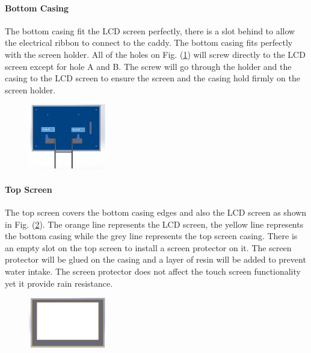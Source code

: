 \documentclass[11pt,landscape]{article}
\begin{document}
\begin{multicols}{3}
\paragraph{Bottom Casing}
The bottom casing fit the LCD screen perfectly, there is a slot behind to allow
the electrical ribbon to connect to the caddy. The bottom casing fits perfectly
with the screen holder. All of the holes on Fig. (\ref{fig:bottom_casing}) will screw
directly to the LCD screen except for hole A and B. The screw will go through
the holder and the casing to the LCD screen to ensure the screen and the casing
hold firmly on the screen holder.

\begin{figure}[H]
    \begin{center}
        \includegraphics[width=0.3\textwidth]{bottomcasing.png}
        \label{fig:bottom_casing}
    \end{center}
\end{figure}

\paragraph{Top Screen}
The top screen covers the bottom casing edges and also the LCD screen as shown
in Fig. (\ref{fig:top_casing}). The orange line represents the LCD screen, the yellow
line represents the bottom casing while the grey line represents the top screen
casing. There is an empty slot on the top screen to install a screen protector
on it. The screen protector will be glued on the casing and a layer of resin
will be added to prevent water intake. The screen protector does not affect the
touch screen functionality yet it provide rain resistance.


\begin{figure}[H]
    \begin{center}
        \includegraphics[width=0.3\textwidth]{topcasing.png}
        \label{fig:top_casing}
    \end{center}
\end{figure}


\end{multicols}
\end{document}
